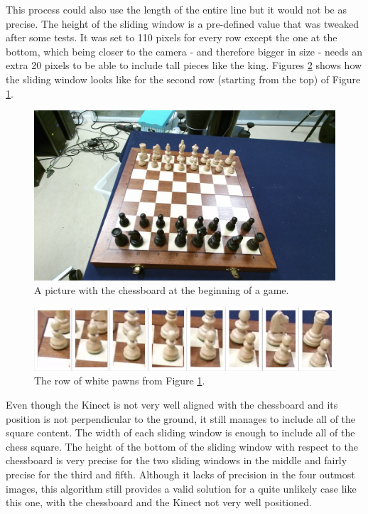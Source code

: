 \documentclass{l4proj}
\begin{document}
This process could also use the length of the entire line but it would not be as precise. The height of the sliding window is a pre-defined value that was tweaked after some tests. It was set to 110 pixels for every row except the one at the bottom, which being closer to the camera - and therefore bigger in size - needs an extra 20 pixels to be able to include tall pieces like the king. Figures \ref{row_of_pawns} shows how the sliding window looks like for the second row (starting from the top) of Figure \ref{camera_image9}. 

\begin{figure}[h!]
\centering
\includegraphics[scale=0.24]{camera_image9.jpeg}
\caption{A picture with the chessboard at the beginning of a game.}
\label{camera_image9}
\end{figure}

\begin{figure}[h!]
\centering
\includegraphics[scale=0.55]{row_of_pawns.png}
\caption{The row of white pawns from Figure \ref{camera_image9}.}
\label{row_of_pawns}
\end{figure}

Even though the Kinect is not very well aligned with the chessboard and its position is not perpendicular to the ground, it still manages to include all of the square content. The width of each sliding window is enough to include all of the chess square. The height of the bottom of the sliding window with respect to the chessboard is very precise for the two sliding windows in the middle and fairly precise for the third and fifth. Although it lacks of precision in the four outmost images, this algorithm still provides a valid solution for a quite unlikely case like this one, with the chessboard and the Kinect not very well positioned.
\end{document}
